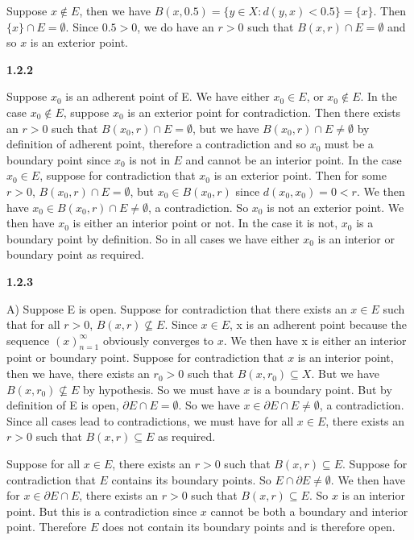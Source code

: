 \documentclass[12pt]{article}
\begin{document}
Suppose $x\notin E$, then we have $B(x,0.5) = \{y\in X: d(y,x)< 0.5\} = \{x\}$. Then $\{x\}\cap E =\emptyset$. Since $0.5>0$, we do have an $r>0$ such that $B(x,r)\cap E =\emptyset$ and so $x$ is an exterior point. 

\textbf{1.2.2}

Suppose $x_0$ is an adherent point of E. We have either $x_0\in E$, or $x_0\notin E$. In the case $x_0\notin E$, suppose $x_0$ is an exterior point for contradiction. Then there exists an $r>0$ such that $B(x_0,r)\cap E = \emptyset$, but we have $B(x_0,r)\cap E \neq \emptyset$ by definition of adherent point, therefore a contradiction and so $x_0$ must be a boundary point since $x_0$ is not in $E$ and cannot be an interior point. In the case $x_0\in E$, suppose for contradiction that $x_0$ is an exterior point. Then for some $r>0$, $B(x_0,r)\cap E = \emptyset$, but $x_0\in B(x_0,r)$ since $d(x_0,x_0) = 0 < r$. We then have $x_0\in B(x_0,r)\cap E \neq \emptyset$, a contradiction. So $x_0$ is not an exterior point. We then have $x_0$ is either an interior point or not. In the case it is not, $x_0$ is a boundary point by definition. So in all cases we have either $x_0$ is an interior or boundary point as required.

\textbf{1.2.3}

A) Suppose E is open. Suppose for contradiction that there exists an $x\in E$ such that for all $r>0$, $B(x,r)\not\subseteq E$. Since $x\in E$, x is an adherent point because the sequence $(x)^\infty_{n=1}$ obviously converges to $x$. We then have x is either an interior point or boundary point. Suppose for contradiction that $x$ is an interior point, then we have, there exists an $r_0>0$ such that $B(x,r_0) \subseteq X$. But we have $B(x,r_0)\not\subseteq E$ by hypothesis. So we must have $x$ is a boundary point. But by definition of E is open, $\partial E \cap E = \emptyset$. So we have $x\in \partial E \cap E\neq \emptyset$, a contradiction. Since all cases lead to contradictions, we must have for all $x\in E$, there exists an $r>0$ such that $B(x,r) \subseteq E$ as required. 

Suppose for all $x\in E$, there exists an $r>0$ such that $B(x,r) \subseteq E$. Suppose for contradiction that $E$ contains its boundary points. So $E\cap \partial E \neq \emptyset$. We then have for $x\in \partial E\cap E$, there exists an $r>0$ such that $B(x,r) \subseteq E$. So $x$ is an interior point. But this is a contradiction since $x$ cannot be both a boundary and interior point. Therefore $E$ does not contain its boundary points and is therefore open.
\end{document}
